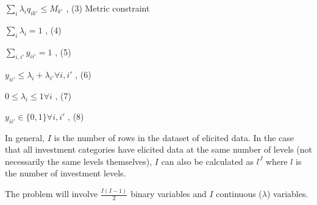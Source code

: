\documentclass[letterpaper,10pt,english]{sphinxmanual}
\begin{document}
\sphinxAtStartPar
\(\sum_i \lambda_{i}q_{ik'} \leq M_{k'}\) , (3) Metric constraint

\sphinxAtStartPar
\(\sum_i \lambda_i = 1\) , (4)

\sphinxAtStartPar
\(\sum_{i,i'} y_{ii'} = 1\) , (5)

\sphinxAtStartPar
\(y_{ii'} \leq \lambda_i + \lambda_{i'} \forall i, i'\) , (6)

\sphinxAtStartPar
\(0 \leq \lambda_i \leq 1 \forall i\) , (7)

\sphinxAtStartPar
\(y_{ii'} \in \{ 0, 1 \} \forall i, i'\) , (8)

\sphinxAtStartPar
{}

\sphinxAtStartPar
In general, \(I\) is the number of rows in the dataset of elicited data. In the case that all investment categories have elicited data at the same number of levels (not necessarily the same levels themselves), \(I\) can also be calculated as \(l^J\) where \(l\) is the number of investment levels.

\sphinxAtStartPar
The problem will involve \(\frac{I(I-1)}{2}\) binary variables and \(I\) continuous (\(\lambda\)) variables.
\end{document}
